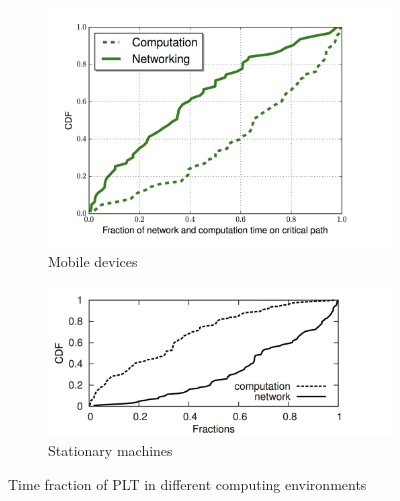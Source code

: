 \begin{figure}[!bth]
\begin{subfigure}[h]{0.5\textwidth}
\centering
\includegraphics[width=\linewidth]{figs/comp_net.png}
\caption{Mobile devices}
\label{fig:mobile-runtime}
\end{subfigure}
\begin{subfigure}[h]{0.5\textwidth}
\centering
\includegraphics[width=\linewidth]{figs/comp_net_desk.png}
\caption{Stationary machines}
\label{fig:mobile-runtime}
\end{subfigure}
\caption{Time fraction of PLT in different computing environments}
\end{figure}

